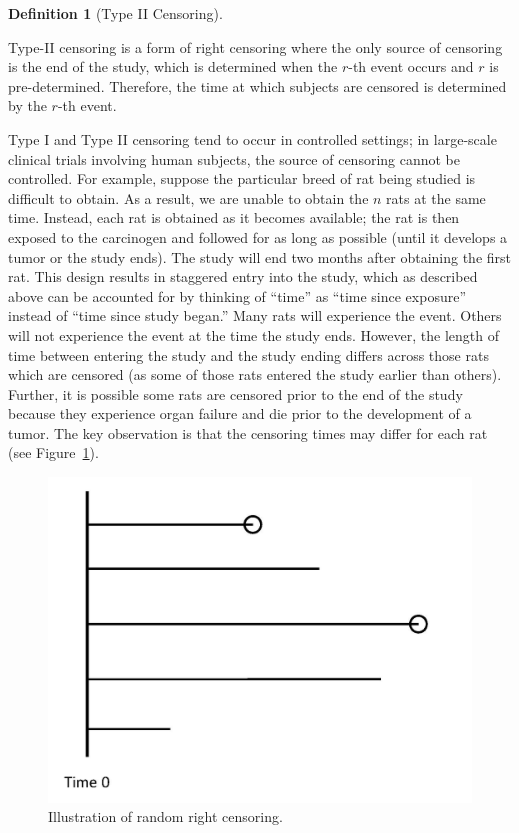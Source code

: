 \documentclass[
  letterpaper,
  DIV=11,
  numbers=noendperiod]{scrreprt}
\theoremstyle{definition}
\newtheorem{definition}{Definition}[chapter]
\theoremstyle{definition}
\theoremstyle{remark}
\begin{document}
\begin{definition}[Type II
Censoring]\protect\hypertarget{def-type-2-censoring}{}\label{def-type-2-censoring}

Type-II censoring is a form of right censoring where the only source of
censoring is the end of the study, which is determined when the \(r\)-th
event occurs and \(r\) is pre-determined. Therefore, the time at which
subjects are censored is determined by the \(r\)-th event.

\end{definition}

Type I and Type II censoring tend to occur in controlled settings; in
large-scale clinical trials involving human subjects, the source of
censoring cannot be controlled. For example, suppose the particular
breed of rat being studied is difficult to obtain. As a result, we are
unable to obtain the \(n\) rats at the same time. Instead, each rat is
obtained as it becomes available; the rat is then exposed to the
carcinogen and followed for as long as possible (until it develops a
tumor or the study ends). The study will end two months after obtaining
the first rat. This design results in staggered entry into the study,
which as described above can be accounted for by thinking of ``time'' as
``time since exposure'' instead of ``time since study began.'' Many rats
will experience the event. Others will not experience the event at the
time the study ends. However, the length of time between entering the
study and the study ending differs across those rats which are censored
(as some of those rats entered the study earlier than others). Further,
it is possible some rats are censored prior to the end of the study
because they experience organ failure and die prior to the development
of a tumor. The key observation is that the censoring times may differ
for each rat (see Figure~\ref{fig-surv-censoring-random}).

\begin{figure}

{\centering \includegraphics{./images/censoring-random.jpg}

}

\caption{\label{fig-surv-censoring-random}Illustration of random right
censoring.}

\end{figure}
\end{document}
